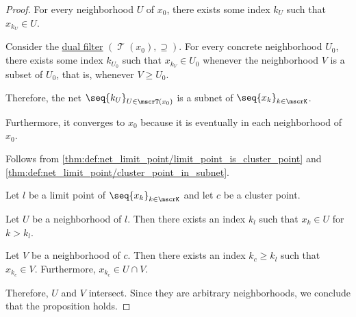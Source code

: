 \begin{proof}
  For every neighborhood \( U \) of \( x_0 \), there exists some index \( k_U \) such that \( x_{k_U} \in U \).

  Consider the \hyperref[ex:def:topological_net/reverse]{dual filter} \( (\mscrT(x_0), \supseteq) \). For every concrete neighborhood \( U_0 \), there exists some index \( k_{U_0} \) such that \( x_{k_V} \in U_0 \) whenever the neighborhood \( V \) is a subset of \( U_0 \), that is, whenever \( V \geq U_0 \).

  Therefore, the net \( \seq{ k_U }_{U \in \mscrT(x_0)} \) is a subnet of \( \seq{ x_k }_{k \in \mscrK} \).

  Furthermore, it converges to \( x_0 \) because it is eventually in each neighborhood of \( x_0 \).

  \NecessitySubProof* Follows from \cref{thm:def:net_limit_point/limit_point_is_cluster_point} and \cref{thm:def:net_limit_point/cluster_point_in_subnet}.

   Let \( l \) be a limit point of \( \seq{ x_k }_{k \in \mscrK} \) and let \( c \) be a cluster point.

  Let \( U \) be a neighborhood of \( l \). Then there exists an index \( k_l \) such that \( x_k \in U \) for \( k > k_l \).

  Let \( V \) be a neighborhood of \( c \). Then there exists an index \( k_c \geq k_l \) such that \( x_{k_c} \in V \). Furthermore, \( x_{k_c} \in U \cap V \).

  Therefore, \( U \) and \( V \) intersect. Since they are arbitrary neighborhoods, we conclude that the proposition holds.
\end{proof}


